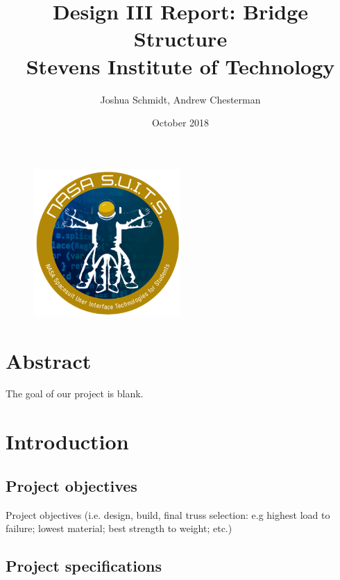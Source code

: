 \documentclass{article}
\title{%
  Design III Report: Bridge Structure \\
	\large Stevens Institute of Technology}
\date{October 2018}
\author{Joshua Schmidt, Andrew Chesterman}
\let\Oldsection\section
\renewcommand{\section}{\FloatBarrier\Oldsection}
\let\Oldsubsection\subsection
\renewcommand{\subsection}{\FloatBarrier\Oldsubsection}
\begin{document}
\maketitle

\bigskip
\bigskip
\bigskip
\bigskip

\begin{figure}[!htb]
  \centering
  \includegraphics[width=0.5\textwidth]{assets/logo.png}
  \label{fig:logo}
\end{figure}

\newpage

\tableofcontents

\newpage


\section{Abstract}

The goal of our project is blank.

\newpage

\section{Introduction}

\subsection{Project objectives}

Project objectives (i.e. design, build, final truss selection: e.g highest load to failure; lowest material; best strength to weight; etc.)

\subsection{Project specifications}
\end{document}
